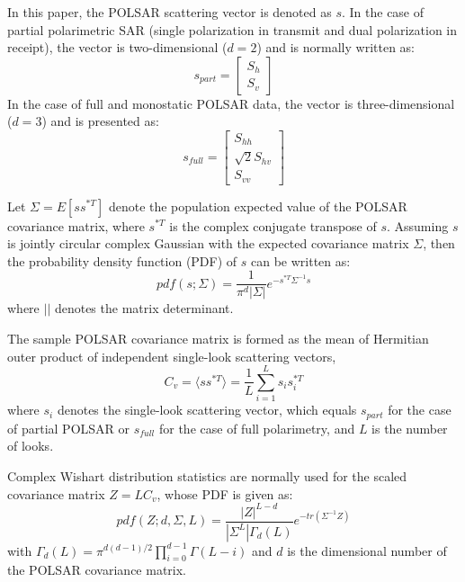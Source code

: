 \documentclass[journal]{IEEEtran}
\begin{document}
In this paper, the POLSAR scattering vector is denoted as $s$.
In the case of partial polarimetric SAR (single polarization in transmit and dual polarization in receipt),
  the vector is two-dimensional ($d=2$) and is normally written as: 
\begin{equation}
s_{part}=\begin{bmatrix}
S_h\\ 
S_v
\end{bmatrix}
\end{equation}
In the case of full and monostatic POLSAR data,
  the vector is three-dimensional ($d=3$) and is presented as:
\begin{equation}
s_{full}=\begin{bmatrix}
S_{hh}\\
\sqrt{2}S_{hv}\\
S_{vv}
\end{bmatrix}
\end{equation}

Let $\Sigma=E [ss^{*T}]$ denote the population expected value of the POLSAR covariance matrix,
  where $s^{*T}$ is the complex conjugate transpose of $s$. 
Assuming %
  $s$ is jointly circular complex Gaussian with the expected covariance matrix $\Sigma$,
  then the probability density function (PDF) of $s$ can be written as:
\begin{equation}
  pdf(s;\Sigma)=\frac{1}{\pi^d|\Sigma|} e^{-s^{*T}\Sigma^{-1}s}
\end{equation}
where $||$ denotes the matrix determinant.

The sample POLSAR covariance matrix is formed as the mean of Hermitian outer product of independent single-look scattering vectors,
\begin{equation}
  C_v = \langle ss^{*T} \rangle = \frac{1}{L} \sum^L_{i=1}s_is_i^{*T}
\end{equation}
where $s_i$ denotes the single-look scattering vector,
  which equals $s_{part}$ for the case of partial POLSAR or
  $s_{full}$ for the case of full polarimetry,
and $L$ is the number of looks.

Complex Wishart distribution statistics are normally used for the scaled covariance matrix
$Z=LC_v$, whose PDF is given as:
\begin{equation}
  pdf(Z;d,\Sigma,L)=\frac{|Z|^{L-d}}{|\Sigma^L|\Gamma_d(L)}e^{-tr(\Sigma^{-1}Z)}
\end{equation}
with $\Gamma_d(L) = \pi^{d(d-1)/2} \prod^{d-1}_{i=0}\Gamma(L-i)$
and $d$ is the dimensional number of the POLSAR covariance matrix.
\end{document}
